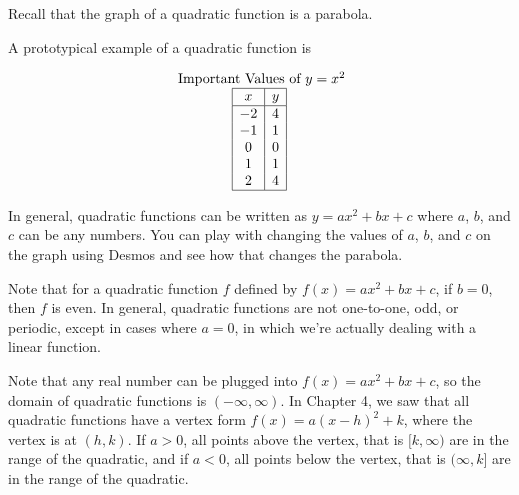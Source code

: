\documentclass[nooutcomes]{ximera}
\begin{document}
Recall that the graph of a quadratic function is a parabola.
 
\begin{example}
A prototypical example of a quadratic function is
 
\begin{center}
\end{center}
 
\begin{center}
\end{center}
 
\[
\begin{array}{c  }
\text{ Important Values of $y=x^2$} \\
 \begin{array}{|c|c|}
 \hline
 x & y\\
 \hline
 -2&4\\
 -1&1\\
 0&0\\
 1&1\\
 2&4\\
 \hline
\end{array}
\end{array}
\]
\end{example}
 
In general, quadratic functions can be written as $y=ax^2+bx+c$ where $a$, $b$, and $c$ can be any numbers.  You can play with changing the values of $a$, $b$, and $c$ on the graph using Desmos and see how that changes the parabola. 
 
\begin{center} 
\end{center}
 
Note that for a quadratic function $f$ defined by $f(x) = ax^2 + bx + c$, if $b = 0$, then $f$ is even. In general, quadratic functions are not one-to-one, odd, or periodic, except in cases where $a = 0$, in which we're actually dealing with a linear function.
 
Note that any real number can be plugged into $f(x) = ax^2 + bx + c$, so the domain of quadratic functions is $(-\infty, \infty)$. In Chapter 4, we saw that all quadratic functions have a vertex form $f(x) = a(x - h)^2 + k$, where the vertex is at $(h, k)$. If $a > 0$, all points above the vertex, that is $[k, \infty)$ are in the range of the quadratic, and if $a < 0$, all points below the vertex, that is $(\infty, k]$ are in the range of the quadratic.
 
\end{document}

